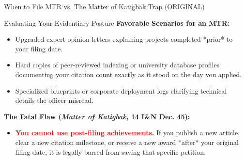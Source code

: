 \documentclass[11pt]{beamer}
\begin{document}
	\begin{frame}{When to File MTR vs. The Matter of Katigbak Trap (ORIGINAL)}
		\scriptsize
		\begin{block}{Evaluating Your Evidentiary Posture}
			\textbf{Favorable Scenarios for an MTR:}
			\begin{itemize}
				\item Upgraded expert opinion letters explaining projects completed *prior* to your filing date.
				\item Hard copies of peer-reviewed indexing or university database profiles documenting your citation count exactly as it stood on the day you applied.
				\item Specialized blueprints or corporate deployment logs clarifying technical details the officer misread.
			\end{itemize}
			\textbf{The Fatal Flaw (\textit{Matter of Katigbak}, 14 I\&N Dec. 45):}
			\begin{itemize}
				\item \textcolor{red}{\textbf{You cannot use post-filing achievements.}} If you publish a new article, clear a new citation milestone, or receive a new award *after* your original filing date, it is legally barred from saving that specific petition.
			\end{itemize}
		\end{block}
	\end{frame}
	
	
\end{document}
